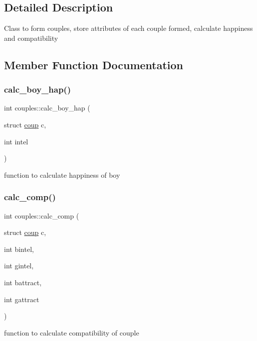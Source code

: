 \subsection{Detailed Description}
Class to form couples, store attributes of each couple formed, calculate happiness and compatibility 

\subsection{Member Function Documentation}
\mbox{\label{classcouples_a55aa04a34886a1c1b46fcfdbd2b400b5}} 
\subsubsection{\texorpdfstring{calc\+\_\+boy\+\_\+hap()}{calc\_boy\_hap()}}
{\footnotesize\ttfamily int couples\+::calc\+\_\+boy\+\_\+hap (\begin{DoxyParamCaption}\item[{struct \hyperlink{structcouples_1_1coup}{coup}}]{c,  }\item[{int}]{intel }\end{DoxyParamCaption})}

function to calculate happiness of boy \mbox{\label{classcouples_a6fb93ee889269a6225cedb618f96b9d0}} 
\subsubsection{\texorpdfstring{calc\+\_\+comp()}{calc\_comp()}}
{\footnotesize\ttfamily int couples\+::calc\+\_\+comp (\begin{DoxyParamCaption}\item[{struct \hyperlink{structcouples_1_1coup}{coup}}]{c,  }\item[{int}]{bintel,  }\item[{int}]{gintel,  }\item[{int}]{battract,  }\item[{int}]{gattract }\end{DoxyParamCaption})}

function to calculate compatibility of couple \mbox{\label{classcouples_a381ac8c4bf63ba171dcbaec0e8da4d09}} 
